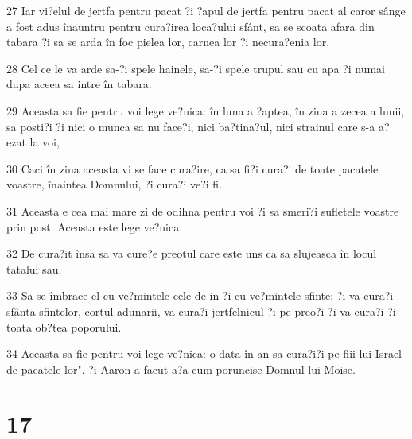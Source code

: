 \par 27 Iar vi?elul de jertfa pentru pacat ?i ?apul de jertfa pentru pacat al caror sânge a fost adus înauntru pentru cura?irea loca?ului sfânt, sa se scoata afara din tabara ?i sa se arda în foc pielea lor, carnea lor ?i necura?enia lor.
\par 28 Cel ce le va arde sa-?i spele hainele, sa-?i spele trupul sau cu apa ?i numai dupa aceea sa intre în tabara.
\par 29 Aceasta sa fie pentru voi lege ve?nica: în luna a ?aptea, în ziua a zecea a lunii, sa posti?i ?i nici o munca sa nu face?i, nici ba?tina?ul, nici strainul care s-a a?ezat la voi,
\par 30 Caci în ziua aceasta vi se face cura?ire, ca sa fi?i cura?i de toate pacatele voastre, înaintea Domnului, ?i cura?i ve?i fi.
\par 31 Aceasta e cea mai mare zi de odihna pentru voi ?i sa smeri?i sufletele voastre prin post. Aceasta este lege ve?nica.
\par 32 De cura?it însa sa va cure?e preotul care este uns ca sa slujeasca în locul tatalui sau.
\par 33 Sa se îmbrace el cu ve?mintele cele de in ?i cu ve?mintele sfinte; ?i va cura?i sfânta sfintelor, cortul adunarii, va cura?i jertfelnicul ?i pe preo?i ?i va cura?i ?i toata ob?tea poporului.
\par 34 Aceasta sa fie pentru voi lege ve?nica: o data în an sa cura?i?i pe fiii lui Israel de pacatele lor". ?i Aaron a facut a?a cum poruncise Domnul lui Moise.

\chapter{17}

